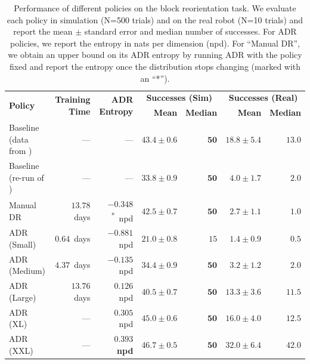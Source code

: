 \begin{table}[h]
    \caption{Performance of different policies on the block reorientation task. We evaluate each policy in simulation (N=500 trials) and on the real robot (N=10 trials) and report the mean $\pm$ standard error and median number of successes. For ADR policies, we report the entropy in nats per dimension (npd). For ``Manual DR'', we obtain an upper bound on its ADR entropy by running ADR with the policy fixed and report the entropy once the distribution stops changing (marked with an ``*'').}
    \label{table:adr-xyz-transfer}
    \centering
    \renewcommand{\arraystretch}{1.3}
        \begin{tabular}{@{}lrr|rr|rr@{}}
            \toprule
            \multirow{2}{*}{\textbf{Policy}} & \multirow{2}{*}{\textbf{Training Time}} & \multirow{2}{*}{\textbf{ADR Entropy}} & \multicolumn{2}{c}{\textbf{Successes (Sim)}} & \multicolumn{2}{c}{\textbf{Successes (Real)}} \\
            & & & \textbf{Mean} & \textbf{Median} & \textbf{Mean} & \textbf{Median} \\
            \midrule
            Baseline (data from \cite{openai2018learning}) & --- & --- & $43.4 \pm 0.6$ & $\mathbf{50}$ & $18.8 \pm 5.4$ & $13.0$ \\
            Baseline (re-run of \cite{openai2018learning}) & --- & --- & $33.8 \pm 0.9$ & $\mathbf{50}$ & $4.0 \pm 1.7$ & $2.0$ \\
            \midrule
            Manual DR & $13.78$~days & $-0.348$\textsuperscript{*}~npd& $42.5 \pm 0.7$ & $\mathbf{50}$ & $2.7 \pm 1.1$ & $1.0$ \\
            \midrule
            ADR (Small) & $0.64$~days & $-0.881$~npd & $21.0 \pm 0.8$ & $15$ & $1.4 \pm 0.9$ & $0.5$ \\
            ADR (Medium) & $4.37$~days & $-0.135$~npd & $34.4 \pm 0.9$ & $\mathbf{50}$ & $3.2 \pm 1.2$ & $2.0$ \\
            ADR (Large) & $13.76$~days & $0.126$~npd & $40.5 \pm 0.7$ & $\mathbf{50}$ & $13.3 \pm 3.6$ & $11.5$ \\
            \midrule
            ADR (XL) & --- & $0.305$~npd & $45.0 \pm 0.6$ & $\mathbf{50}$ & $16.0 \pm 4.0$ & $12.5$ \\
            ADR (XXL) & --- & $\mathbf{0.393}$~\textbf{npd} & $\mathbf{46.7 \pm 0.5}$ & $\mathbf{50}$ & $\mathbf{32.0 \pm 6.4}$ & $\mathbf{42.0}$ \\
            \bottomrule
        \end{tabular}
\end{table}

